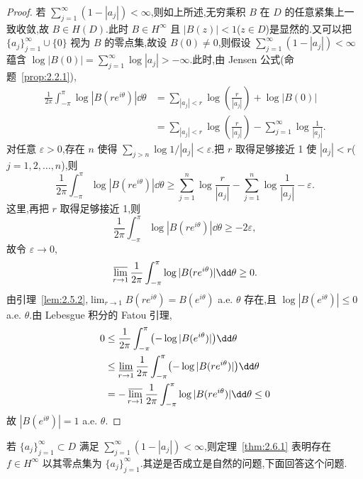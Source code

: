 \begin{proof}
若 $\sum_{j=1}^{\infty}(1 - |a_{j}|) < \infty$,则如上所述,无穷乘积 $B$ 在 $D$ 的任意紧集上一致收敛,故 $B \in H(D)$.此时 $B \in H^{\infty}$ 且 $|B(z)| < 1$($z \in D$)是显然的.又可以把 $\{a_{j}\}_{j=1}^{\infty} \cup \{0\}$ 视为 $B$ 的零点集,故设 $B(0) \neq 0$,则假设 $\sum_{j=1}^{\infty}(1 - |a_{j}|) < \infty$ 蕴含 $\log|B(0)| = \sum_{j=1}^{\infty}\log|a_{j}| > -\infty$.此时,由 Jensen 公式(命题~\ref{prop:2.2.1}),
\begin{align*}
\frac{1}{2\pi}\int_{-\pi}^{\pi}\log|B(re^{i\theta})|\dd\theta & = \sum_{|a_{j}| < r}\log\left(\frac{r}{|a_{j}|}\right) + \log|B(0)| \\
& = \sum_{|a_{j}| < r}\log\left(\frac{r}{|a_{j}|}\right) - \sum_{j = 1}^{\infty}\log\frac{1}{|a_{j}|}.
\end{align*}
对任意 $\varepsilon > 0$,存在 $n$ 使得 $\sum_{j > n}\log 1/|a_{j}| < \varepsilon$.把 $r$ 取得足够接近 1 使 $|a_{j}| < r$($j = 1, 2, \ldots, n$),则
\begin{equation*}
\frac{1}{2\pi}\int_{-\pi}^{\pi}\log|B(re^{i\theta})|\dd\theta \geq \sum_{j = 1}^{n}\log\frac{r}{|a_{j}|} - \sum_{j = 1}^{n}\log\frac{1}{|a_{j}|} - \varepsilon.
\end{equation*}
这里,再把 $r$ 取得足够接近 1,则
\begin{equation*}
\frac{1}{2\pi}\int_{-\pi}^{\pi}\log|B(re^{i\theta})|\dd\theta \geq -2\varepsilon,
\end{equation*}
故令 $\varepsilon \to 0$,
\begin{equation*}
\varlimsup_{r \to 1}\frac{1}{2\pi}\int_{-\pi}^{\pi}\log|B(re^{i\theta})|\dd\theta \geq 0.
\end{equation*}
由引理~\ref{lem:2.5.2},$\lim_{r \to 1}B(re^{i\theta}) = B(e^{i\theta})$ a.e. $\theta$ 存在,且 $\log|B(e^{i\theta})| \leq 0$ a.e. $\theta$.由 Lebesgue 积分的 Fatou 引理,
\begin{align*}
0 &\leq \frac{1}{2\pi}\int_{-\pi}^{\pi}\bigl(-\log|B(e^{i\theta})|\bigr)\dd\theta \\
&\leq \varliminf_{r \to 1}\frac{1}{2\pi}\int_{-\pi}^{\pi}\bigl(-\log|B(re^{i\theta})|\bigr)\dd\theta \\
&= -\varlimsup_{r \to 1}\frac{1}{2\pi}\int_{-\pi}^{\pi}\log|B(re^{i\theta})|\dd\theta \leq 0
\end{align*}
故 $|B(e^{i\theta})| = 1$ a.e. $\theta$.
\end{proof}

若 $\{a_{j}\}_{j=1}^{\infty} \subset D$ 满足 $\sum_{j=1}^{\infty}(1 - |a_{j}|) < \infty$,则定理~\ref{thm:2.6.1} 表明存在 $f \in H^{\infty}$ 以其零点集为 $\{a_{j}\}_{j=1}^{\infty}$.其逆是否成立是自然的问题,下面回答这个问题.

